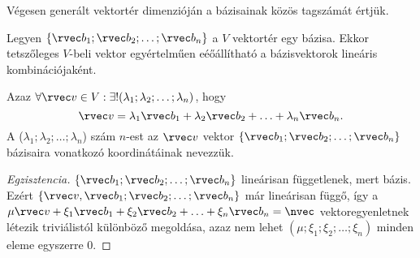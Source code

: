 \begin{definition}
  Végesen generált vektortér dimenzióján a bázisainak közös tagszámát értjük.
\end{definition}

\begin{statement}
  Legyen $\{ \rvec b_1; \rvec b_2; \dots; \rvec b_n \}$ a $V$ vektortér egy
  bázisa. Ekkor tetszőleges $V$-beli vektor egyértelműen eéőállítható a
  bázisvektorok lineáris kombinációjaként.

  Azaz $\forall \rvec v \in V: \exists! (\lambda_1; \lambda_2; \dots; \lambda_n)$,
  hogy
  $$
    \rvec v
    = \lambda_1 \rvec b_1
    + \lambda_2 \rvec b_2
    + \ldots
    + \lambda_n \rvec b_n
    \text.
  $$
  A ($\lambda_1; \lambda_2; \dots; \lambda_n$) szám $n$-est az $\rvec v$ vektor
  $\{ \rvec b_1; \rvec b_2; \dots; \rvec b_n \}$ bázisaira vonatkozó
  koordinátáinak nevezzük.

  \begin{proof}[Egzisztencia]
    $\{ \rvec b_1; \rvec b_2; \dots; \rvec b_n \}$ lineárisan
    függetlenek, mert bázis. Ezért $\{ \rvec v, \rvec b_1; \rvec b_2;
      \ldots; \rvec b_n \}$ már lineárisan függő, így a
    $
      \mu \rvec v + \xi_1 \rvec b_1 + \xi_2 \rvec b_2 + \ldots
      + \xi_n \rvec b_n = \nvec
    $
    vektoregyenletnek létezik triviálistól különböző megoldása, azaz nem
    lehet $(\mu; \xi_1; \xi_2; \ldots; \xi_n)$ minden eleme
    egyszerre 0.


\end{proof}
\end{statement}
